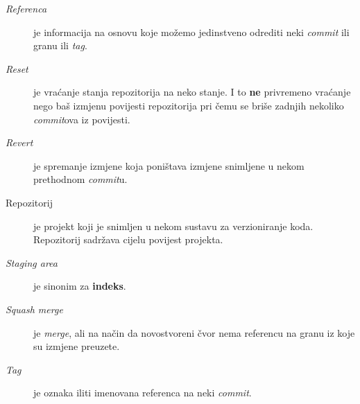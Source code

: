 \begin{description}
    \item[\emph{Referenca}] je informacija na osnovu koje možemo jedinstveno odrediti neki \emph{commit} ili granu ili \emph{tag}.
    \item[\emph{Reset}] je vraćanje stanja repozitorija na neko stanje. I to \textbf{ne} privremeno vraćanje nego baš izmjenu povijesti repozitorija pri čemu se briše zadnjih nekoliko \emph{commit}ova iz povijesti.
    \item[\emph{Revert}] je spremanje izmjene koja poništava izmjene snimljene u nekom prethodnom \emph{commit}u.
    \item[Repozitorij] je projekt koji je snimljen u nekom sustavu za verzioniranje koda. Repozitorij sadržava cijelu povijest projekta.
    \item[\emph{Staging area}] je sinonim za \textbf{indeks}.
    \item[\emph{Squash merge}] je \emph{merge}, ali na način da novostvoreni čvor nema referencu na granu iz koje su izmjene preuzete.
    \item[\emph{Tag}] je oznaka iliti imenovana referenca na neki \emph{commit}.
\end{description}


